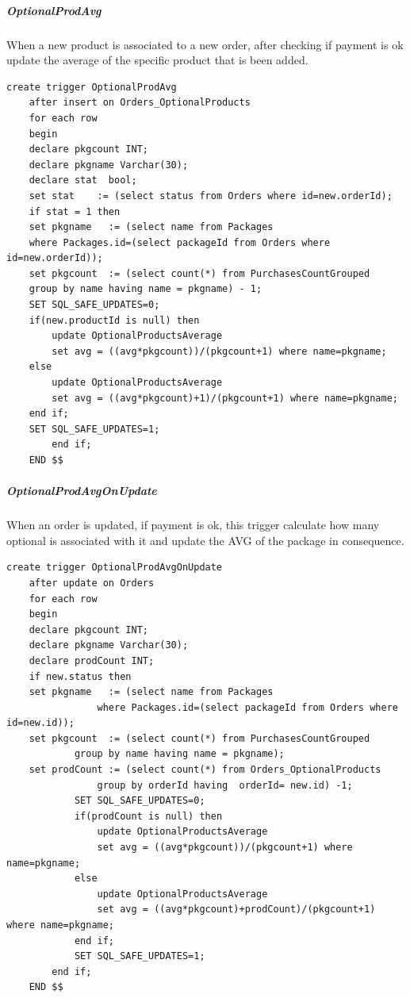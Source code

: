 \documentclass{article}
\begin{document}
\subparagraph{OptionalProdAvg}
When a new product is associated to a new order, after checking if payment is ok update the average of the specific product that is been added.
\begin{lstlisting}
create trigger OptionalProdAvg
	after insert on Orders_OptionalProducts
	for each row
    begin
    declare pkgcount INT;
    declare pkgname Varchar(30);
    declare stat  bool;
    set stat    := (select status from Orders where id=new.orderId);
    if stat = 1 then
    set pkgname   := (select name from Packages 
    where Packages.id=(select packageId from Orders where id=new.orderId));
	set pkgcount  := (select count(*) from PurchasesCountGrouped 
	group by name having name = pkgname) - 1;
	SET SQL_SAFE_UPDATES=0;
    if(new.productId is null) then
		update OptionalProductsAverage 
		set avg = ((avg*pkgcount))/(pkgcount+1) where name=pkgname;
    else 
		update OptionalProductsAverage 
		set avg = ((avg*pkgcount)+1)/(pkgcount+1) where name=pkgname;
    end if;
    SET SQL_SAFE_UPDATES=1;
        end if;
    END $$
\end{lstlisting}

\subparagraph{OptionalProdAvgOnUpdate}
When an order is updated, if payment is ok, this trigger calculate how many optional is associated with it and update the AVG of the package in consequence.
\begin{lstlisting}
create trigger OptionalProdAvgOnUpdate
	after update on Orders
    for each row
    begin
	declare pkgcount INT;
    declare pkgname Varchar(30);
    declare prodCount INT;
    if new.status then
    set pkgname   := (select name from Packages 
    			where Packages.id=(select packageId from Orders where id=new.id));
	set pkgcount  := (select count(*) from PurchasesCountGrouped 
			group by name having name = pkgname);
    set prodCount := (select count(*) from Orders_OptionalProducts 
    			group by orderId having  orderId= new.id) -1;
			SET SQL_SAFE_UPDATES=0;
            if(prodCount is null) then
				update OptionalProductsAverage 
				set avg = ((avg*pkgcount))/(pkgcount+1) where name=pkgname;
            else 
				update OptionalProductsAverage 
				set avg = ((avg*pkgcount)+prodCount)/(pkgcount+1) where name=pkgname;
            end if;
            SET SQL_SAFE_UPDATES=1;
        end if;
    END $$
\end{lstlisting}
\end{document}
